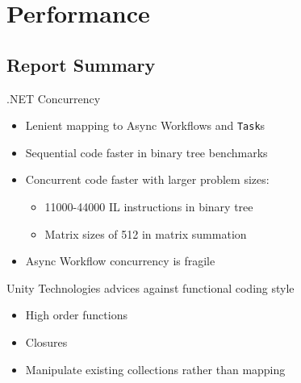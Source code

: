 \section{Performance}

\subsection{Report Summary}\label{sec:authors}
\begin{frame}{\secname}{\subsecname}
	.NET Concurrency
	\begin{itemize}
		\item<1-> Lenient mapping to Async Workflows and \texttt{Task}s %
		\item<2-> Sequential code faster in binary tree benchmarks
		\item<3-> Concurrent code faster with larger problem sizes:
		\begin{itemize}
			\item 11000-44000 IL instructions in binary tree
			\item Matrix sizes of 512 in matrix summation
		\end{itemize}
		\item<4-> Async Workflow concurrency is fragile
	\end{itemize}
\end{frame}

\begin{frame}{\secname}{\subsecname}
	Unity Technologies advices against functional coding style
	\begin{itemize}
		\item<2-> High order functions
		\item<3-> Closures
		\item<4-> Manipulate existing collections rather than mapping
	\end{itemize}
\end{frame}

